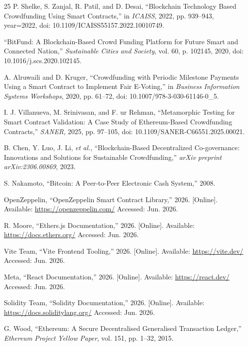 \documentclass[conference]{IEEEtran}
\begin{document}
\begin{thebibliography}{25}
P. Shelke, S. Zanjal, R. Patil, and D. Desai, ``Blockchain Technology Based Crowdfunding Using Smart Contracts,'' in \textit{ICAISS}, 2022, pp. 939--943, year={2022}, doi: 10.1109/ICAISS55157.2022.10010749.

``BitFund: A Blockchain-Based Crowd Funding Platform for Future Smart and Connected Nation,'' \textit{Sustainable Cities and Society}, vol. 60, p. 102145, 2020, doi: 10.1016/j.scs.2020.102145.

A. Alruwaili and D. Kruger, ``Crowdfunding with Periodic Milestone Payments Using a Smart Contract to Implement Fair E-Voting,'' in \textit{Business Information Systems Workshops}, 2020, pp. 61--72, doi: 10.1007/978-3-030-61146-0\_5.

I. J. Villanueva, M. Srinivasan, and F. ur Rehman, ``Metamorphic Testing for Smart Contract Validation: A Case Study of Ethereum-Based Crowdfunding Contracts,'' \textit{SANER}, 2025, pp. 97--105, doi: 10.1109/SANER-C66551.2025.00021.

B. Chen, Y. Luo, J. Li, \textit{et al.}, ``Blockchain-Based Decentralized Co-governance: Innovations and Solutions for Sustainable Crowdfunding,'' \textit{arXiv preprint arXiv:2306.00869}, 2023.

S. Nakamoto, ``Bitcoin: A Peer-to-Peer Electronic Cash System,'' 2008.

OpenZeppelin, ``OpenZeppelin Smart Contract Library,'' 2026. [Online]. Available: \url{https://openzeppelin.com/} Accessed: Jun. 2026.

R. Moore, ``Ethers.js Documentation,'' 2026. [Online]. Available: \url{https://docs.ethers.org/} Accessed: Jun. 2026.

Vite Team, ``Vite Frontend Tooling,'' 2026. [Online]. Available: \url{https://vite.dev/} Accessed: Jun. 2026.

Meta, ``React Documentation,'' 2026. [Online]. Available: \url{https://react.dev/} Accessed: Jun. 2026.

Solidity Team, ``Solidity Documentation,'' 2026. [Online]. Available: \url{https://docs.soliditylang.org/} Accessed: Jun. 2026.

G. Wood, ``Ethereum: A Secure Decentralised Generalised Transaction Ledger,'' \textit{Ethereum Project Yellow Paper}, vol. 151, pp. 1--32, 2015.


\end{thebibliography}
\end{document}
